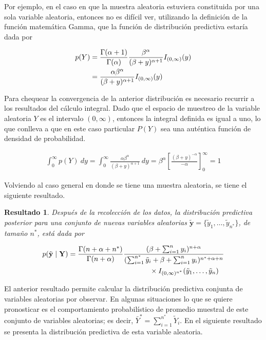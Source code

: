 \documentclass[
  10pt,
  spanish,
]{book}
\newtheorem{proposition}{Resultado}[chapter]
\theoremstyle{definition}
\theoremstyle{definition}
\theoremstyle{definition}
\theoremstyle{definition}
\theoremstyle{remark}
\begin{document}
Por ejemplo, en el caso en que la muestra aleatoria estuviera constituida por una sola variable aleatoria, entonces no es difícil ver, utilizando la definición de la función matemática Gamma, que la función de distribución predictiva estaría dada por

\begin{align*}
p(Y)&=\frac{\Gamma(\alpha+1)}{\Gamma(\alpha)}\frac{\beta^\alpha}{(\beta+y)^{\alpha+1}}
I_{(0,\infty)}(y)\notag \\
&=\frac{\alpha \beta^\alpha}{(\beta+y)^{\alpha+1}}
I_{(0,\infty)}(y)
\end{align*}

Para chequear la convergencia de la anterior distribución es necesario recurrir a los resultados del cálculo integral. Dado que el espacio de muestreo de la variable aleatoria \(Y\) es el intervalo \((0,\infty)\), entonces la integral definida es igual a uno, lo que conlleva a que en este caso particular \(P(Y)\) sea una auténtica función de densidad de probabilidad.

\begin{align*}
\int_0^{\infty}p(Y)\ dy=\int_0^{\infty}\frac{\alpha \beta^\alpha}{(\beta+y)^{\alpha+1}} \ dy
=  \beta^\alpha \left[\frac{(\beta+y)^{-\alpha}}{-\alpha} \right]_0^{\infty}
=1
\end{align*}

Volviendo al caso general en donde se tiene una muestra aleatoria, se tiene el siguiente resultado.

\begin{proposition}
\protect\hypertarget{prp:unnamed-chunk-57}{}{\label{prp:unnamed-chunk-57} }Después de la recolección de los datos, la distribución predictiva posterior para una conjunto de nuevas variables aleatorias \(\tilde{\mathbf{y}}=\{\tilde{y}_1,\ldots,\tilde{y}_{n^*}\}\), de tamaño \(n^*\), está dada por

\begin{align}
p(\tilde{\mathbf{y}} \mid \mathbf{Y})&=
\frac{\Gamma(n+\alpha+n^{*})}{\Gamma(n+\alpha)}
\frac{(\beta+\sum_{i=1}^ny_i)^{n+\alpha}}{(\sum_{i=1}^{n^*}\tilde{y}_i+\beta+\sum_{i=1}^ny_i)^{n^*+\alpha+n}}\notag\\
&\hspace{4cm}\times
I_{(0,\infty)^{n^*}}(\tilde{y}_1,\ldots,\tilde{y}_n)
\end{align}
\end{proposition}

El anterior resultado permite calcular la distribución predictiva conjunta de variables aleatorias por observar. En algunas situaciones lo que se quiere pronosticar es el comportamiento probabilístico de promedio muestral de este conjunto de variables aleatorias; es decir, \(\bar{Y}^*=\sum_{i=1}^{n^*}\tilde{Y}_i\). En el siguiente resultado se presenta la distribución predictiva de esta variable aleatoria.
\end{document}
